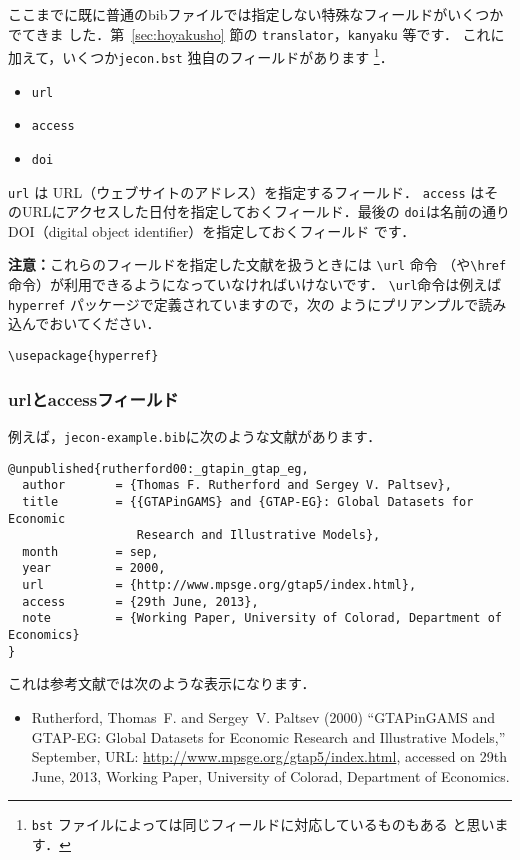 \documentclass[a4j,10pt]{jarticle}
\begin{document}
ここまでに既に普通のbibファイルでは指定しない特殊なフィールドがいくつかでてきま
した．第~\ref{sec:hoyakusho} 節の \texttt{translator}，\texttt{kanyaku} 等です．
これに加えて，いくつか\texttt{jecon.bst} 独自のフィールドがあります
\footnote{\texttt{bst} ファイルによっては同じフィールドに対応しているものもある
と思います．}．
\begin{itemize}
 \item \texttt{url}
 \item \texttt{access}
 \item \texttt{doi}
\end{itemize}

\texttt{url} は URL（ウェブサイトのアドレス）を指定するフィールド．
\texttt{access} はそのURLにアクセスした日付を指定しておくフィールド．最後の
\texttt{doi}は名前の通りDOI（digital object identifier）を指定しておくフィールド
です．

\begin{screen}
 \textbf{注意：}これらのフィールドを指定した文献を扱うときには \verb|\url| 命令
 （や\verb|\href| 命令）が利用できるようになっていなければいけないです．
 \verb|\url|命令は例えば\texttt{hyperref} パッケージで定義されていますので，次の
 ようにプリアンプルで読み込んでおいてください．
 \begin{verbatim}
\usepackage{hyperref}
 \end{verbatim} 
\end{screen}

\subsubsection{urlとaccessフィールド}

例えば，\texttt{jecon-example.bib}に次のような文献があります．
\begin{verbatim}
@unpublished{rutherford00:_gtapin_gtap_eg,
  author       = {Thomas F. Rutherford and Sergey V. Paltsev},
  title        = {{GTAPinGAMS} and {GTAP-EG}: Global Datasets for Economic
                  Research and Illustrative Models},
  month        = sep,
  year         = 2000,
  url          = {http://www.mpsge.org/gtap5/index.html},
  access       = {29th June, 2013},
  note         = {Working Paper, University of Colorad, Department of Economics}
}
\end{verbatim}

これは参考文献では次のような表示になります．
\begin{screen}
 \begin{itemize}
  \item  Rutherford, Thomas~F. and Sergey~V. Paltsev (2000) ``{GTAPinGAMS} and
 {GTAP-EG}: Global Datasets for Economic Research and Illustrative Models,''
 September, URL: \url{http://www.mpsge.org/gtap5/index.html}, accessed on 29th
 June, 2013, Working Paper, University of Colorad, Department of Economics.
 \end{itemize}
\end{screen}
\end{document}
